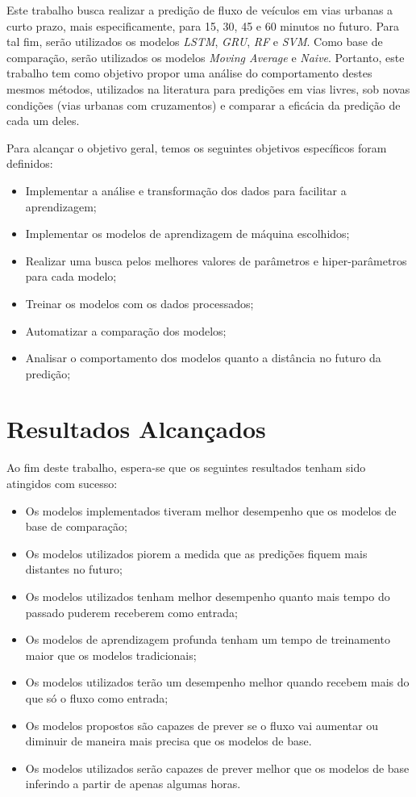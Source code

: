 Este trabalho busca realizar a predição de fluxo de veículos em vias urbanas a curto prazo, mais especificamente, para 15, 30, 45 e 60 minutos no futuro. Para tal fim, serão utilizados os modelos \textit{\acrfull{LSTM}}, \textit{\acrfull{GRU}}, \textit{\acrfull{RF}} e \textit{\acrfull{SVM}}. Como base de comparação, serão utilizados os modelos \textit{Moving Average} e \textit{Naive}. Portanto, este trabalho tem como objetivo propor uma análise do comportamento destes mesmos métodos, utilizados na literatura para predições em vias livres, sob novas condições (vias urbanas com cruzamentos) e comparar a eficácia da predição de cada um deles.

Para alcançar o objetivo geral, temos os seguintes objetivos específicos foram definidos:

\begin{itemize}
    \item Implementar a análise e transformação dos dados para facilitar a aprendizagem;
    \item Implementar os modelos de aprendizagem de máquina escolhidos; 
    \item Realizar uma busca pelos melhores valores de parâmetros e hiper-parâmetros para cada modelo;
    \item Treinar os modelos com os dados processados;
    \item Automatizar a comparação dos modelos;
    \item Analisar o comportamento dos modelos quanto a distância no futuro da predição;
\end{itemize}

\section{Resultados Alcançados} %

Ao fim deste trabalho, espera-se que os seguintes resultados tenham sido atingidos com sucesso:

\begin{itemize}
    \item  Os modelos implementados tiveram melhor desempenho que os modelos de base de comparação;
    \item Os modelos utilizados piorem a medida que as predições fiquem mais distantes no futuro;
    \item Os modelos utilizados tenham melhor desempenho quanto mais tempo do passado puderem receberem como entrada;
    \item Os modelos de aprendizagem profunda tenham um tempo de treinamento maior que os modelos tradicionais;
    \item Os modelos utilizados terão um desempenho melhor quando recebem mais do que só o fluxo como entrada;
    \item Os modelos propostos são capazes de prever se o fluxo vai aumentar ou diminuir de maneira mais precisa que os modelos de base.
    \item Os modelos utilizados serão capazes de prever melhor que os modelos de base inferindo a partir de apenas algumas horas.
\end{itemize}

